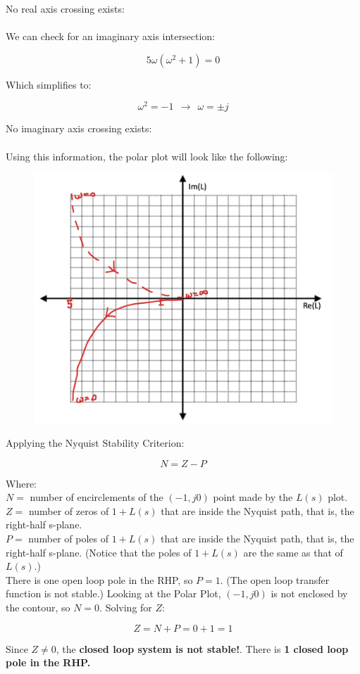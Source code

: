 \documentclass[12pt, letterpaper]{../assignment}
\begin{document}
No real axis crossing exists:
\\\\
We can check for an imaginary axis intersection:

$$ 5 \omega (\omega ^2 + 1) = 0$$

Which simplifies to:

$$ \omega ^2 = -1 \ \ \rightarrow \ \ \omega = \pm j $$

No imaginary axis crossing exists:
\\\\
Using this information, the polar plot will look like the following:

\begin{figure}[H]
    \centering
    \includegraphics[width=0.5\linewidth]{./figures/PolarPlot2.png}
    \label{fig:pp2}
 \end{figure}
  
Applying the Nyquist Stability Criterion:

$$ N=Z-P $$

Where:\\
$N =$ number of encirclements of the $(-1, j0)$ point made by the $L(s)$ plot.\\
$Z =$ number of zeros of $1+L(s)$ that are inside the Nyquist path, that is, the right-half s-plane.\\
$P =$ number of poles of $1+L(s)$ that are inside the Nyquist path, that is, the right-half s-plane.
(Notice that the poles of $1 +L(s)$ are the same as that of $L(s)$.)\\

There is one open loop pole in the RHP, so $P = 1$.
(The open loop transfer function is not stable.)
Looking at the Polar Plot, $(-1, j0)$ is not enclosed by the contour, so $N = 0$.
Solving for $Z$:

$$ Z = N+P = 0+1 = 1 $$

\begin{answer}
    Since $Z \ne 0 $, the \textbf{closed loop system is not stable!}.
    There is \textbf{1 closed loop pole in the RHP.}
\end{answer}




\end{document}
